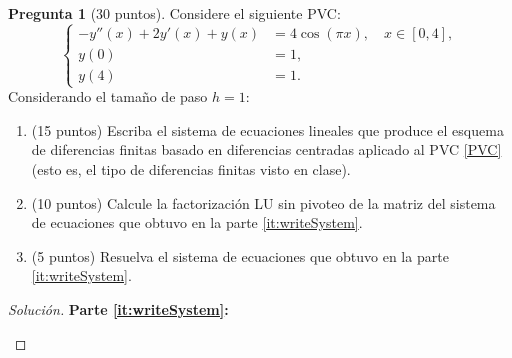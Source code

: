 \documentclass[letterpaper,12pt]{article}
\theoremstyle{definition}
\newtheorem{question}{Pregunta}
\numberwithin{equation}{question}
\newenvironment{solution}{\begin{proof}[Solución]}{\end{proof}}
\begin{document}
\begin{question}[30 puntos]
Considere el siguiente PVC:
%
\begin{equation}\label{PVC}
\left\{\begin{aligned}
-y''(x) + 2 y'(x) + y(x) & = 4 \cos(\pi x), \quad x \in [0,4],\\
y(0) & = 1,\\
y(4) & = 1.
\end{aligned}\right.
\end{equation}
%
Considerando el tamaño de paso $h = 1$:
\begin{enumerate}
\item\label{it:writeSystem} (15 puntos) Escriba el sistema de ecuaciones lineales que produce el esquema de diferencias finitas basado en diferencias centradas aplicado al PVC \eqref{PVC} (esto es, el tipo de diferencias finitas visto en clase).
\item\label{it:factorizeSystem} (10 puntos) Calcule la factorización LU sin pivoteo de la matriz del sistema de ecuaciones que obtuvo en la parte \ref{it:writeSystem}.
\item\label{it:solveSystem} (5 puntos) Resuelva el sistema de ecuaciones que obtuvo en la parte \ref{it:writeSystem}.
\end{enumerate}
\begin{solution}\hfill

\textbf{Parte \ref{it:writeSystem}:}

\begin{center}\end{center}


\end{solution}
\end{question}
\end{document}
